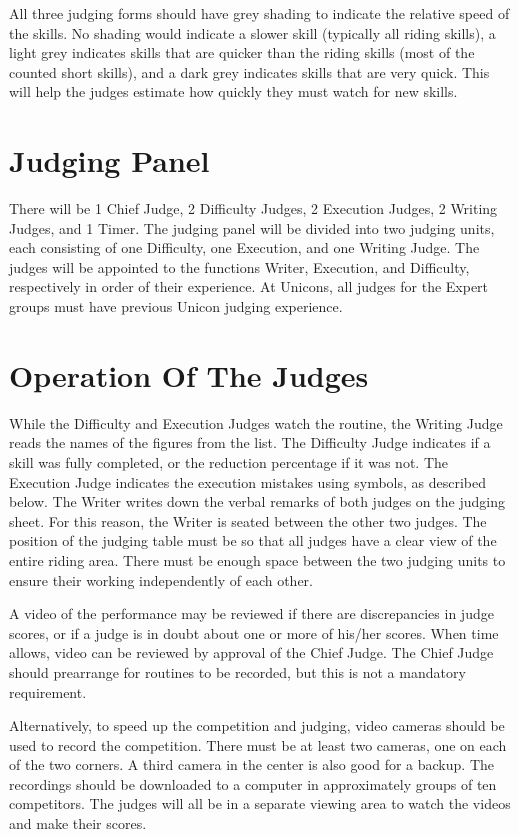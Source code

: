 All three judging forms should have grey shading to indicate the relative speed of the skills.
No shading would indicate a slower skill (typically all riding skills), a light grey indicates skills that are quicker than the riding skills (most of the counted short skills), and a dark grey indicates skills that are very quick.
This will help the judges estimate how quickly they must watch for new skills.

\newpage

\section{Judging Panel \label{sec:freestyle_std-judging-panel}}
There will be 1 Chief Judge, 2 Difficulty Judges, 2 Execution Judges, 2 Writing Judges, and 1 Timer.
The judging panel will be divided into two judging units, each consisting of one Difficulty, one Execution, and one Writing Judge.
The judges will be appointed to the functions Writer, Execution, and Difficulty, respectively in order of their experience.
At Unicons, all judges for the Expert groups must have previous Unicon judging experience.

\section{Operation Of The Judges}
While the Difficulty and Execution Judges watch the routine, the Writing Judge reads the names of the figures from the list.
The Difficulty Judge indicates if a skill was fully completed, or the reduction percentage if it was not.
The Execution Judge indicates the execution mistakes using symbols, as described below.
The Writer writes down the verbal remarks of both judges on the judging sheet.
For this reason, the Writer is seated between the other two judges.
The position of the judging table must be so that all judges have a clear view of the entire riding area.
There must be enough space between the two judging units to ensure their working independently of each other.

A video of the performance may be reviewed if there are discrepancies in judge scores, or if a judge is in doubt about one or more of his/her scores.
When time allows, video can be reviewed by approval of the Chief Judge.
The Chief Judge should prearrange for routines to be recorded, but this is not a mandatory requirement.

Alternatively, to speed up the competition and judging, video cameras should be used to record the competition.
There must be at least two cameras, one on each of the two corners.
A third camera in the center is also good for a backup.
The recordings should be downloaded to a computer in approximately groups of ten competitors.
The judges will all be in a separate viewing area to watch the videos and make their scores.

